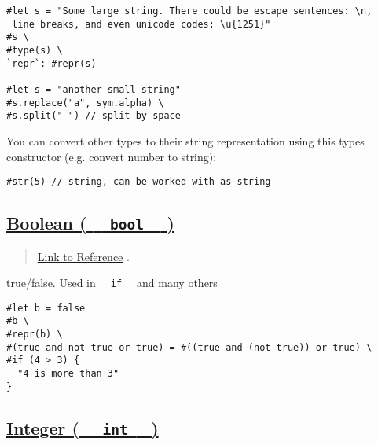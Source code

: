 \begin{verbatim}
#let s = "Some large string. There could be escape sentences: \n,
 line breaks, and even unicode codes: \u{1251}"
#s \
#type(s) \
`repr`: #repr(s)

#let s = "another small string"
#s.replace("a", sym.alpha) \
#s.split(" ") // split by space
\end{verbatim}

\pandocbounded{}

You can convert other types to their string representation using this
type\textquotesingle s constructor (e.g. convert number to string):

\begin{verbatim}
#str(5) // string, can be worked with as string
\end{verbatim}

\pandocbounded{}

\subsection{\texorpdfstring{\hyperref[boolean-bool]{Boolean (
\texttt{\ }{\texttt{\ bool\ }}\texttt{\ }
)}}{Boolean (   bool   )}}\label{boolean-bool}

\begin{quote}
\href{https://typst.app/docs/reference/foundations/bool/}{Link to
Reference} .
\end{quote}

true/false. Used in \texttt{\ }{\texttt{\ if\ }}\texttt{\ } and many
others

\begin{verbatim}
#let b = false
#b \
#repr(b) \
#(true and not true or true) = #((true and (not true)) or true) \
#if (4 > 3) {
  "4 is more than 3"
}
\end{verbatim}

\pandocbounded{}

\subsection{\texorpdfstring{\hyperref[integer-int]{Integer (
\texttt{\ }{\texttt{\ int\ }}\texttt{\ }
)}}{Integer (   int   )}}\label{integer-int}


